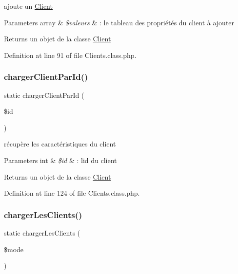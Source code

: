 ajoute un \hyperlink{class_client}{Client} 
\begin{DoxyParams}[1]{Parameters}
array & {\em \$valeurs} & \+: le tableau des propriétés du client à ajouter \\
\hline
\end{DoxyParams}
\begin{DoxyReturn}{Returns}
un objet de la classe \hyperlink{class_client}{Client} 
\end{DoxyReturn}


Definition at line 91 of file Clients.\+class.\+php.

\mbox{\label{class_clients_a812b47f6e12cbe4ab79a0ba6a953c2d4}} 
\subsubsection{\texorpdfstring{charger\+Client\+Par\+Id()}{chargerClientParId()}}
{\footnotesize\ttfamily static charger\+Client\+Par\+Id (\begin{DoxyParamCaption}\item[{}]{\$id }\end{DoxyParamCaption})\hspace{0.3cm}{\ttfamily [static]}}

récupère les caractéristiques du client 
\begin{DoxyParams}[1]{Parameters}
int & {\em \$id} & \+: l\textquotesingle{}id du client \\
\hline
\end{DoxyParams}
\begin{DoxyReturn}{Returns}
un objet de la classe \hyperlink{class_client}{Client} 
\end{DoxyReturn}


Definition at line 124 of file Clients.\+class.\+php.

\mbox{\label{class_clients_a2b12a9858fa98f0e4ac82d61e964d6cf}} 
\subsubsection{\texorpdfstring{charger\+Les\+Clients()}{chargerLesClients()}}
{\footnotesize\ttfamily static charger\+Les\+Clients (\begin{DoxyParamCaption}\item[{}]{\$mode }\end{DoxyParamCaption})\hspace{0.3cm}{\ttfamily [static]}}


